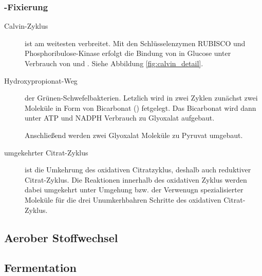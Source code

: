 \subsubsection{-Fixierung}
\begin{description}
	\item[Calvin-Zyklus] ist am weitesten verbreitet.
		Mit den Schlüsselenzymen RUBISCO und Phosphoribulose-Kinase
		erfolgt die Bindung von  in Glucose
		unter Verbrauch von  und .
		Siehe Abbildung \ref{fig:calvin_detail}.

	\item[Hydroxypropionat-Weg] der Grünen-Schwefelbakterien.
		Letzlich wird in zwei Zyklen zunächst zwei Moleküle 
		in Form von Bicarbonat () fetgelegt.
		Das Bicarbonat wird dann unter ATP und NADPH Verbrauch zu Glyoxalat aufgebaut.

		Anschließend werden zwei Glyoxalat Moleküle zu Pyruvat umgebaut.

	\item[umgekehrter Citrat-Zyklus] ist die Umkehrung des oxidativen Citratzyklus,
		deshalb auch reduktiver Citrat-Zyklus.
		Die Reaktionen innerhalb des oxidativen Zyklus werden dabei umgekehrt
		unter Umgehung bzw. der Verwenugn spezialisierter Moleküle für die 
		drei Unumkerhbahren Schritte des oxidativen Citrat-Zyklus.

\end{description}

\subsection{Aerober Stoffwechsel}
\subsection{Fermentation}
